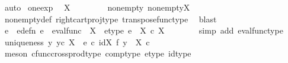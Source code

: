 \begin{isabellebody}
\ auto\isanewline
{}\isamarkupfalse%
%
\endisatagproof
{\isafoldproof}%
%
\isadelimproof
\isanewline
%
\endisadelimproof
\isanewline
{}\isamarkupfalse%
\ one{\isacharunderscore}{\kern0pt}exp{\isacharcolon}{\kern0pt}\isanewline
\ \ {\isachardoublequoteopen}{\isasymone}\isactrlbsup X\isactrlesup \ {\isasymcong}\ {\isasymone}{\isachardoublequoteclose}\isanewline
%
\isadelimproof
%
\endisadelimproof
%
\isatagproof
{}\isamarkupfalse%
\ {\isacharminus}{\kern0pt}\ \isanewline
\ \ \isamarkupfalse%
\ nonempty{\isacharcolon}{\kern0pt}\ {\isachardoublequoteopen}nonempty{\isacharparenleft}{\kern0pt}{\isasymone}\isactrlbsup X\isactrlesup {\isacharparenright}{\kern0pt}{\isachardoublequoteclose}\isanewline
\ \ \ \ \isamarkupfalse%
\ nonempty{\isacharunderscore}{\kern0pt}def\ right{\isacharunderscore}{\kern0pt}cart{\isacharunderscore}{\kern0pt}proj{\isacharunderscore}{\kern0pt}type\ transpose{\isacharunderscore}{\kern0pt}func{\isacharunderscore}{\kern0pt}type\ \isamarkupfalse%
\ blast\isanewline
\ \ \isamarkupfalse%
\ e\ \ e{\isacharunderscore}{\kern0pt}defn{\isacharcolon}{\kern0pt}\ {\isachardoublequoteopen}e\ {\isacharequal}{\kern0pt}\ eval{\isacharunderscore}{\kern0pt}func\ {\isasymone}\ X{\isachardoublequoteclose}\ \ e{\isacharunderscore}{\kern0pt}type{\isacharcolon}{\kern0pt}\ {\isachardoublequoteopen}e\ {\isacharcolon}{\kern0pt}\ X\ {\isasymtimes}\isactrlsub c\ {\isasymone}\isactrlbsup X\isactrlesup \ {\isasymrightarrow}\ {\isasymone}{\isachardoublequoteclose}\isanewline
\ \ \ \ \isamarkupfalse%
\ {\isacharparenleft}{\kern0pt}simp\ add{\isacharcolon}{\kern0pt}\ eval{\isacharunderscore}{\kern0pt}func{\isacharunderscore}{\kern0pt}type{\isacharparenright}{\kern0pt}\isanewline
\ \ \isamarkupfalse%
\ uniqueness{\isacharcolon}{\kern0pt}\ {\isachardoublequoteopen}{\isasymforall}y{\isachardot}{\kern0pt}\ {\isacharparenleft}{\kern0pt}y{\isasymin}\isactrlsub c\ {\isasymone}\isactrlbsup X\isactrlesup \ {\isasymlongrightarrow}\ e\ {\isasymcirc}\isactrlsub c\ {\isacharparenleft}{\kern0pt}id{\isacharparenleft}{\kern0pt}X{\isacharparenright}{\kern0pt}\ {\isasymtimes}\isactrlsub f\ y{\isacharparenright}{\kern0pt}\ {\isacharcolon}{\kern0pt}\ X\ {\isasymtimes}\isactrlsub c\ {\isasymone}\ \ {\isasymrightarrow}\ {\isasymone}{\isacharparenright}{\kern0pt}{\isachardoublequoteclose}\isanewline
\ \ \ \ \isamarkupfalse%
\ {\isacharparenleft}{\kern0pt}meson\ cfunc{\isacharunderscore}{\kern0pt}cross{\isacharunderscore}{\kern0pt}prod{\isacharunderscore}{\kern0pt}type\ comp{\isacharunderscore}{\kern0pt}type\ e{\isacharunderscore}{\kern0pt}type\ id{\isacharunderscore}{\kern0pt}type{\isacharparenright}{\kern0pt}\isanewline

\end{isabellebody}
